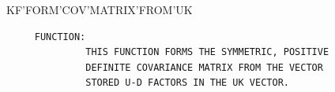 \begin{frame}
KF'FORM'COV'MATRIX'FROM'UK
\begin{verbatim}
     FUNCTION:
              THIS FUNCTION FORMS THE SYMMETRIC, POSITIVE
              DEFINITE COVARIANCE MATRIX FROM THE VECTOR
              STORED U-D FACTORS IN THE UK VECTOR.


\end{verbatim}
\end{frame}
